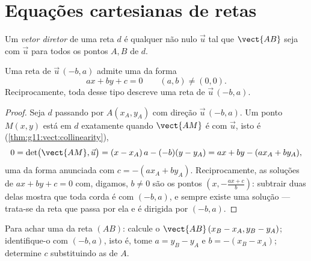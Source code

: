 \section{Equações cartesianas de retas}

\begin{definition}\label{def:g11:vect:direction}
Um \emph{vetor diretor} de uma reta $d$ é qualquer
 não nulo $\vec u$ tal que $\vect{AB}$ seja  com $\vec u$
para todos os pontos $A, B$ de $d$.
\end{definition}

\begin{theorem}\label{thm:g11:vect:cartesian}
Uma reta de  $\vec u\,(-b, a)$ admite uma  da forma
\[
ax + by + c = 0
\qquad (a, b) \neq (0, 0).
\]
Reciprocamente, toda  desse tipo descreve uma reta de  $\vec u\,(-b, a)$.
\end{theorem}

\begin{proof}
Seja $d$ passando por $A(x_A, y_A)$ com direção $\vec u\,(-b, a)$. Um
ponto $M(x, y)$ está em $d$ exatamente quando $\vect{AM}$ é  com
$\vec u$, isto é (\cref{thm:g11:vect:collinearity}),
\[
0 = \det\bigl(\vect{AM}, \vec u\bigr)
= (x - x_A)\,a - (-b)(y - y_A)
= ax + by - (a x_A + b y_A),
\]
uma  da forma anunciada com $c = -(a x_A + b y_A)$.
Reciprocamente, as soluções de $ax + by + c = 0$ com, digamos,
$b \neq 0$ são os pontos $\left(x, -\frac{a x + c}{b}\right)$: subtrair
duas delas mostra que toda corda é  com $(-b, a)$, e sempre
existe uma solução --- trata-se da reta que passa por ela e é dirigida
por $(-b, a)$.
\end{proof}

\begin{method}\label{met:g11:vect:twopoints}
Para achar uma  da reta $(AB)$: calcule o 
$\vect{AB}\,(x_B - x_A, y_B - y_A)$; identifique-o com $(-b, a)$, isto é,
tome $a = y_B - y_A$ e $b = -(x_B - x_A)$; determine $c$ substituindo as
 de $A$.
\end{method}

